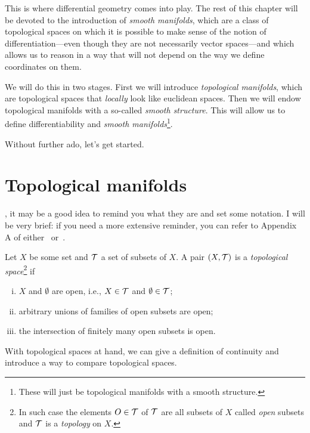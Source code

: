 This is where differential geometry comes into play.
The rest of this chapter will be devoted to the introduction of \emph{smooth manifolds}, which are a class of topological spaces on which it is possible to make sense of the notion of differentiation---even though they are not necessarily vector spaces---and which allows us to reason in a way that will not depend on the way we define coordinates on them.

We will do this in two stages.
First we will introduce \emph{topological manifolds}, which are topological spaces that \emph{locally} look like euclidean spaces.
Then we will endow topological manifolds with a so-called \emph{smooth structure}.
This will allow us to define differentiability and \emph{smooth manifolds}\footnote{These will just be topological manifolds with a smooth structure.}.

Without further ado, let's get started.

\section{Topological manifolds}\label{sec:top_manifolds}

, it may be a good idea to remind you what they are and set some notation.
I will be very brief: if you need a more extensive reminder, you can refer to Appendix A of either~\cite{book:tu} or~\cite{book:lee}.

\begin{definition}
	Let $X$ be some set and $\mathcal{T}$ a set of subsets of $X$.
	A pair $(X, \mathcal{T})$ is a \emph{topological space}\footnote{In such case the elements $O\in\mathcal{T}$ of $\mathcal{T}$ are all subsets of $X$ called \emph{open} subsets and $\mathcal{T}$ is a \emph{topology} on $X$.} if
	\begin{enumerate}[(i)]
		\item $X$ and $\emptyset$ are open, i.e., $X\in \mathcal{T}$ and $\emptyset\in\mathcal{T}$;
		\item arbitrary unions of families of open subsets are open;
		\item the intersection of finitely many open subsets is open.
	\end{enumerate}
\end{definition}

With topological spaces at hand, we can give a definition of continuity and introduce a way to compare topological spaces.

